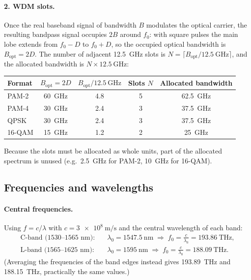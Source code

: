 \paragraph{2. WDM slots.}
Once the real baseband signal of bandwidth $B$ modulates the optical carrier, the resulting bandpass signal
occupies $2B$ around $f_0$: with square pulses the main lobe extends from $f_0 - D$ to $f_0 + D$, so the occupied
optical bandwidth is $B_\mathrm{opt} = 2D$. The number of adjacent \SI{12.5}{\giga\hertz} slots is
$N = \lceil B_\mathrm{opt}/\SI{12.5}{\giga\hertz}\rceil$, and the allocated bandwidth is $N\times\SI{12.5}{\giga\hertz}$:
\begin{center}
\begin{tabular}{lcccc}
  \toprule
  Format & $B_\mathrm{opt} = 2D$ & $B_\mathrm{opt}/\SI{12.5}{\giga\hertz}$ & Slots $N$ & Allocated bandwidth \\
  \midrule
  PAM-2  & \SI{60}{\giga\hertz} & 4.8 & 5 & \SI{62.5}{\giga\hertz} \\
  PAM-4  & \SI{30}{\giga\hertz} & 2.4 & 3 & \SI{37.5}{\giga\hertz} \\
  QPSK   & \SI{30}{\giga\hertz} & 2.4 & 3 & \SI{37.5}{\giga\hertz} \\
  16-QAM & \SI{15}{\giga\hertz} & 1.2 & 2 & \SI{25}{\giga\hertz} \\
  \bottomrule
\end{tabular}
\end{center}
Because the slots must be allocated as whole units, part of the allocated spectrum is unused
(e.g.\ \SI{2.5}{\giga\hertz} for PAM-2, \SI{10}{\giga\hertz} for 16-QAM).


\subsection{Frequencies and wavelengths}
\label{sec:2_2}
\paragraph{Central frequencies.}
Using $f = c/\lambda$ with $c = \SI{3e8}{\metre\per\second}$ and the central wavelength of each band:
\begin{align}
  \text{C-band (1530--1565 nm):}\quad & \lambda_0 = \SI{1547.5}{\nano\metre}
  \;\Rightarrow\; f_0 = \frac{c}{\lambda_0} = \SI{193.86}{\tera\hertz},\\
  \text{L-band (1565--1625 nm):}\quad & \lambda_0 = \SI{1595}{\nano\metre}
  \;\Rightarrow\; f_0 = \frac{c}{\lambda_0} = \SI{188.09}{\tera\hertz}.
\end{align}
(Averaging the frequencies of the band edges instead gives \SI{193.89}{\tera\hertz} and \SI{188.15}{\tera\hertz},
practically the same values.)

